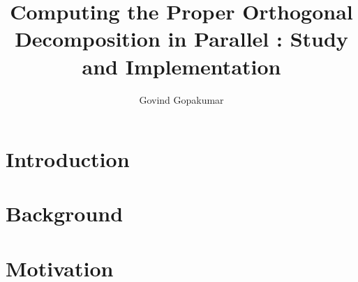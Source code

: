 \documentclass[]{aiaa-tc_mod}%
\title{ Computing the Proper Orthogonal Decomposition in Parallel : 
	 Study and Implementation}
\author{ Govind Gopakumar }
\begin{document}
\maketitle

\begin{abstract}
\end{abstract}

\section{Introduction}


\section{Background}

\section{Motivation}




\begin{thebibliography}{}%
\end{thebibliography}
\end{document}
